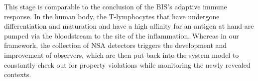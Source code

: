 This stage is comparable to the conclusion of the BIS's adaptive immune response. In the human body, the T-lymphocytes that have undergone differentiation and maturation and have a high affinity for an antigen at hand are pumped via the bloodstream to the site of the inflammation. Whereas in our framework, the collection of NSA detectors triggers the development and improvement of observers, which are then put back into the system model to constantly check out for property violations while monitoring the newly revealed contexts.

